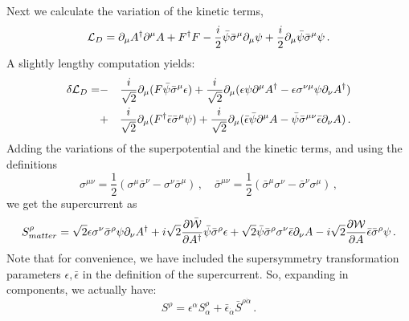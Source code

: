 Next we calculate the variation of the kinetic terms,
$$
{\cal L}_{D} = \partial_\mu A^\dagger \partial^\mu A +
F^\dagger F-\frac{i}{2}\bar{\psi} \bar{\sigma}^\mu\partial_\mu\psi+
\frac{i}{2}\partial_\mu\bar{\psi}\bar{\sigma}^\mu\psi\,.
$$
A slightly lengthy computation yields:
\begin{eqnarray}
\delta {\cal L}_{D}=&-&\frac{i}{\sqrt{2}}\partial_\mu (F\bar{\psi}
\bar{\sigma}^\mu \epsilon ) +
\frac{i}{\sqrt{2}} \partial_\mu (\epsilon\psi\partial^\mu A^\dagger - 
\epsilon \sigma^{\nu\mu}\psi \partial_\nu A^\dagger)\nonumber \\
&+& \frac{i}{\sqrt{2}}\partial_\mu (F^\dagger \bar{\epsilon}
\bar{\sigma}^\mu\psi)+\frac{i}{\sqrt{2}}\partial_\mu (\bar{\epsilon} 
\bar{\psi}\partial^\mu A-\bar{\psi}\bar{\sigma}^{\mu\nu}\bar{\epsilon}
\partial_\nu A )\,.\nonumber
\end{eqnarray}
Adding the variations of the superpotential and the kinetic terms, and
using the definitions 
$$
\sigma^{\mu\nu}=\frac{1}{2} (\sigma^\mu \bar{\sigma}^\nu -
\sigma^\nu \bar{\sigma}^\mu )\,,\quad
\bar{\sigma}^{\mu\nu} = \frac{1}{2} (\bar{\sigma}^\mu \sigma^\nu
- \bar{\sigma}^\nu \sigma^\mu ) \,,
$$
we get the supercurrent as 
\begin{equation}
S^\rho_{matter}=\sqrt{2}\epsilon \sigma^\nu\bar{\sigma}^\rho \psi
\partial_\nu A^\dagger + i \sqrt{2}\frac{\partial\bar{{\cal W}}}
{\partial A^\dagger}\bar{\psi}\bar{\sigma}^\rho\epsilon\nonumber 
+ \sqrt{2}\bar{\psi} \bar{\sigma}^\rho\sigma^\nu\bar{\epsilon}
\partial_\nu A - i\sqrt{2}\frac{\partial {\cal W}}{\partial A} 
\bar{\epsilon} \bar{\sigma}^\rho \psi\,. 
\label{N=1scch}
\end{equation}
Note that for convenience, we have included the supersymmetry
transformation parameters $\epsilon,\bar\epsilon$ in the definition of
the supercurrent. So, expanding in components, we actually have:
\begin{equation}
S^\rho =\epsilon^\alpha S^\rho_\alpha + \bar\epsilon_{\dot\alpha}
\bar S^{\rho\dot\alpha}\,.
\label{S-comp}
\end{equation}
 
